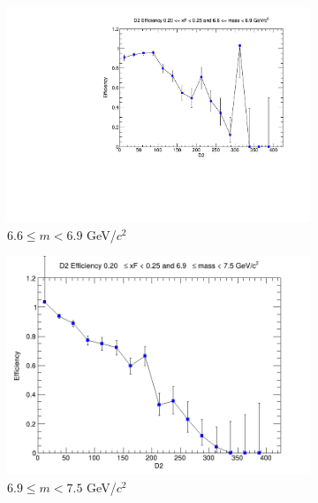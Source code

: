 \begin{figure}[p]
\begin{subfigure}[b]{0.32\textwidth}
        \includegraphics[width=\textwidth]{./kTrackerEfficiencyPlots/D2_Efficiency_xF4_mass8.pdf}
        \caption{$6.6 \leq m < 6.9$ GeV/$c^2$}
        \label{fig:xF4_mass8}
    \end{subfigure}
    \vspace{0.5cm}
    \begin{subfigure}[b]{0.32\textwidth}
        \centering
        \includegraphics[width=\textwidth]{./kTrackerEfficiencyPlots/D2_Efficiency_xF4_mass9.png}
        \caption{$6.9 \leq m < 7.5$ GeV/$c^2$}
        \label{fig:xF4_mass9}
    \end{subfigure}
    \hfill
    \begin{subfigure}[b]{0.32\textwidth}
        \centering

\end{subfigure}
\end{figure}
